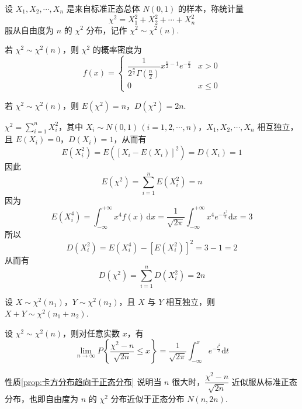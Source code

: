 \begin{definition} \label{def:卡方分布}
    设 $X_1, X_2, \cdots, X_n$ 是来自标准正态总体 $N(0,1)$ 的样本，称统计量
    $$
    \chi^2 = X_1^2 + X_2^2 + \cdots + X_n^2
    $$
    服从自由度为 $n$ 的 $\chi^2$ 分布，记作 $\chi^2 \sim \chi^2(n)$.
\end{definition}

若 $\chi^2 \sim \chi^2(n)$，则 $\chi^2$ 的概率密度为
$$
f(x) = \begin{cases}
    \dfrac{1}{2^{\frac{n}{2}} \Gamma(\frac{n}{2})} x^{\frac{n}{2} - 1} e^{-\frac{x}{2}} & x>0 \\
    0 & x \leqslant 0
\end{cases}
$$

\setcounter{propertyname}{0}

\begin{property} \label{prop:卡方分布的数学期望和方差}
    若 $\chi^2 \sim \chi^2(n)$，则 $E(\chi^2) = n$，$D(\chi^2) = 2n$.
\end{property}

\begin{myproof}
    $\chi^2 = \displaystyle\sum_{i=1}^n X_i^2$，其中 $X_i \sim N(0,1) \, (i=1,2,\cdots,n)$，$X_1, X_2, \cdots, X_n$ 相互独立，且 $E(X_i) = 0$，$D(X_i) = 1$，从而有
    $$
    E(X_i^2) = E([X_i - E(X_i)]^2) = D(X_i) = 1
    $$
    因此
    $$
    E(\chi^2) = \sum_{i=1}^n E(X_i^2) = n
    $$
    因为
    $$
    E(X_i^4) = \int_{-\infty}^{+\infty} x^4 f(x) \, \text{d}x = \dfrac{1}{\sqrt{2 \pi}} \int_{-\infty}^{+\infty} x^4 e^{-\frac{x^2}{2}} \text{d}x = 3
    $$
    所以
    $$
    D(X_i^2) = E(X_i^4) - [E(X_i^2)]^2 = 3-1 = 2
    $$
    从而有
    $$
    D(\chi^2) = \sum_{i=1}^n D(X_i^2) = 2n
    $$
\end{myproof}

\begin{property}[（可加性）]
    设 $X \sim \chi^2(n_1)$，$Y \sim \chi^2(n_2)$，且 $X$ 与 $Y$ 相互独立，则 $X+Y \sim \chi^2(n_1 + n_2)$.
\end{property}

\begin{property} \label{prop:卡方分布趋向于正态分布}
    设 $\chi^2 \sim \chi^2(n)$，则对任意实数 $x$，有
    $$
    \lim_{n \to \infty} P \left\{ \dfrac{\chi^2 - n}{\sqrt{2n}} \leqslant x \right\} = \dfrac{1}{\sqrt{2 \pi}} \int_{-\infty}^{x} e^{-\frac{t^2}{2}} \text{d}t
    $$
\end{property}

性质\ref*{prop:卡方分布趋向于正态分布} 说明当 $n$ 很大时，$\dfrac{\chi^2 - n}{\sqrt{2n}}$ 近似服从标准正态分布，也即自由度为 $n$ 的 $\chi^2$ 分布近似于正态分布 $N(n,2n)$.

